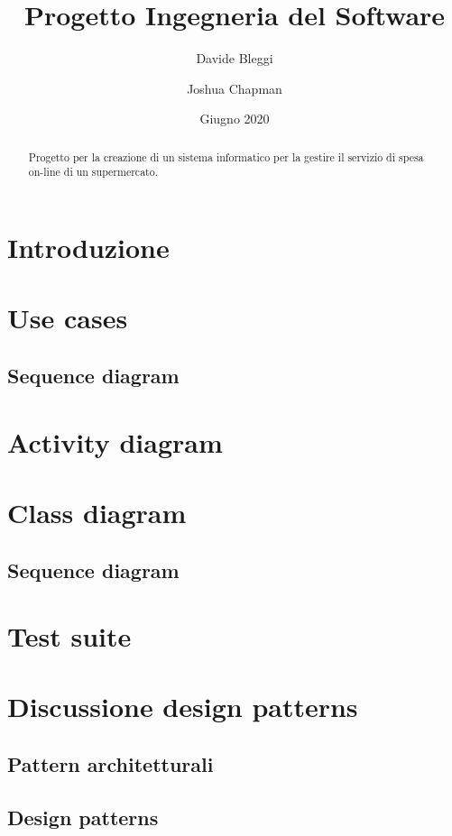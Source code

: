 \documentclass[12pt, a4paper]{report}
\title{Progetto Ingegneria del Software}
\author{Davide Bleggi \and Joshua Chapman}
\date{Giugno 2020}
\numberwithin{equation}{section} %
\begin{document}
\begin{titlepage}
  \maketitle
\end{titlepage}

\tableofcontents
\newpage

\begin{abstract}
  Progetto per la creazione di un sistema informatico per la gestire il servizio
  di spesa on-line di un supermercato.
\end{abstract}

\section{Introduzione}

\section{Use cases}

\subsection{Sequence diagram}

\section{Activity diagram}

\section{Class diagram}

\subsection{Sequence diagram}

\section{Test suite}

\section{Discussione design patterns}

\subsection{Pattern architetturali}

\subsection{Design patterns}
\end{document}
